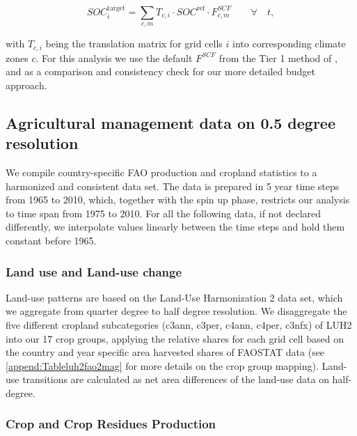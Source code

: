 \documentclass[gc, manuscript]{copernicus}
\begin{document}
\begin{equation}
SOC^{\text{target}}_{i} = \sum_{c,m} T_{c,i} \cdot SOC^{\text{ref}} \cdot F^{SCF}_{c,m} \qquad\forall\quad t,
\label{eq:tier1}
\end{equation}

with \(T_{c,i}\) being the translation matrix for grid cells \(i\) into corresponding climate zones \(c\). For this analysis we use the default \(F^{SCF}\) from the Tier 1 method of \citep{ipcc_2006_2006}, and \citep{ipcc_2019_2019} as a comparison and consistency check for our more detailed budget approach.

\newpage

\hypertarget{sec:agrimanagement}{%
\subsection{Agricultural management data on 0.5 degree resolution}\label{sec:agrimanagement}}

We compile country-specific FAO production and cropland statistics \citep{faostat_faostat_2016} to a harmonized and consistent data set. The data is prepared in 5 year time steps from 1965 to 2010, which, together with the spin up phase, restricts our analysis to time span from 1975 to 2010. For all the following data, if not declared differently, we interpolate values linearly between the time steps and hold them constant before 1965.

\hypertarget{sec:landuse}{%
\subsubsection{Land use and Land-use change}\label{sec:landuse}}

Land-use patterns are based on the Land-Use Harmonization 2 \citep{hurtt_harmonization_2020} data set, which we aggregate from quarter degree to half degree resolution. We disaggregate the five different cropland subcategories (c3ann, c3per, c4ann, c4per, c3nfx) of LUH2 into our 17 crop groups, applying the relative shares for each grid cell based on the country and year specific area harvested shares of FAOSTAT data \citep{faostat_faostat_2016} (see \ref{append:Tableluh2fao2mag} for more details on the crop group mapping). Land-use transitions are calculated as net area differences of the land-use data on half-degree.

\hypertarget{sec:residues}{%
\subsubsection{Crop and Crop Residues Production}\label{sec:residues}}
\end{document}
